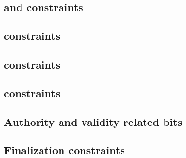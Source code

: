 \subsection{\ct{} and \maxCt{} constraints                                                            }  \label{rlp auth: generalities: ct and ct_max}                               %
\subsection{\rlpAuthUtilsColumnSizeCountdown{} constraints                                            }  \label{rlp auth: generalities: byte size countdown constraints}             %
\subsection{\authorityIsSenderAcc{} constraints                                                       }  \label{rlp auth: generalities: sender is authority acc}                     %
\subsection{\authorityIsSenderTot{} constraints                                                       }  \label{rlp auth: generalities: sender is authority tot}                     %
\subsection{Authority \macroEcrecover{} and validity related bits                                     }  \label{rlp auth: generalities: authority validity and recovery bits}        %
\subsection{Finalization constraints                                                                  }  \label{rlp auth: generalities: finalization}                                %



